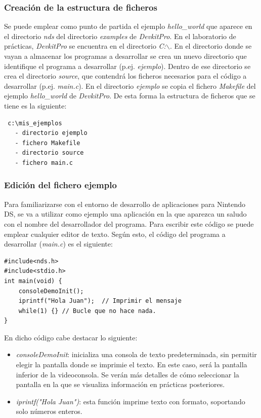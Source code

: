 \subsubsection{Creación de la estructura de ficheros}
Se puede emplear como punto de partida el ejemplo  \textit{hello\_world} que aparece en el directorio \textit{nds} del directorio \textit{examples} de  \textit{DevkitPro}. En  el laboratorio de prácticas, \textit{DevkitPro} se encuentra en el directorio \textit{C:$\backslash$}. En el directorio donde se vayan a almacenar los  programas a desarro\-llar se crea un nuevo directorio que identifique el programa a desarrollar (p.ej. \textit{ejemplo}). Dentro de ese directorio se crea el directorio \textit{source}, que contendrá los ficheros necesarios para el código a desarrollar (p.ej. \textit{main.c}). En el directorio \textit{ejemplo} se copia el fichero \textit{Makefile} del  ejemplo  \textit{hello\_world} de \textit{DevkitPro}. De esta forma la estructura de ficheros que se tiene es la siguiente:

{\scriptsize
 \begin{verbatim}
 c:\mis_ejemplos
   - directorio ejemplo
   - fichero Makefile
   - directorio source
   - fichero main.c
\end{verbatim}
}

\subsubsection{Edición del fichero ejemplo}
Para familiarizarse con el entorno de desarrollo de aplicaciones para Nintendo DS, se va a utilizar como ejemplo una aplicación en la que aparezca un saludo con el nombre del desarrollador del programa. Para escribir este código se puede emplear cualquier editor de texto. Según esto, el código del programa a desarrollar (\textit{main.c}) es el siguiente:

\begin{lstlisting}
#include<nds.h>
#include<stdio.h>
int main(void) {
    consoleDemoInit();
    iprintf("Hola Juan");  // Imprimir el mensaje 
    while(1) {} // Bucle que no hace nada.     
}
\end{lstlisting}

En dicho código cabe destacar lo siguiente:
\begin{itemize}
\item \textit{consoleDemoInit}: inicializa una consola de texto predeterminada, sin permitir elegir la pantalla donde se imprimie el texto. En este caso, será la pantalla inferior de la videoconsola. Se verán más detalles de cómo seleccionar la pantalla en la que se visualiza información en prácticas posteriores. 
%
\item  \textit{iprintf("Hola Juan")}: esta función imprime texto con formato, soportando solo números enteros.
\end{itemize}

